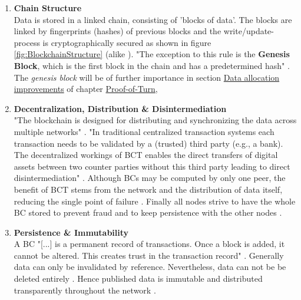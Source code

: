 \begin{enumerate}
	\item \textbf{Chain Structure} \\
	Data is stored in a linked chain, consisting of 'blocks of data'.
	The blocks are linked by fingerprints (hashes) of previous blocks and the write/update-process is cryptographically secured
	as shown in figure \ref{fig:BlockchainStructure} (alike \citet[654]{Lin.2017}).
	"The exception to this rule is the \textbf{Genesis Block}, which is the first block in the chain and has a predetermined hash"
	\cite[181]{Oliveira.2019}.
	The \textit{genesis block} will be of further importance in section \hyperref[sec:DataAllocationImprovements]{Data allocation improvements}
	of chapter \hyperref[chap:PoT]{Proof-of-Turn},
	\begin{figure}
	\end{figure}

	\item \textbf{Decentralization, Distribution \& Disintermediation} \\
	"The blockchain is designed for distributing and synchronizing the data across multiple networks"
	\cite[6]{Sharma.2020}.
	"In traditional centralized transaction systems each transaction needs to be validated by a (trusted) third party (e.g., a bank). The decentralized workings of \gls{BCT} enables the direct transfers of digital assets between two counter parties without this third party leading to direct disintermediation" \cite[17]{Butijn.2020}.
	Although \gls{BC}s may be computed by only one peer, the benefit of \gls{BCT} stems from the network and the distribution of data itself,
	reducing the single point of failure \cite[79764]{Bodkhe.2020}.
	Finally all nodes strive to have the whole \gls{BC} stored to prevent fraud and to keep persistence with the other nodes \cite[79766]{Bodkhe.2020}.
	
	\item \textbf{Persistence \& Immutability} \\
	A \gls{BC} "[...] is a permanent record of transactions. Once a block is added, it cannot be altered. This creates trust in the transaction record" \cite[53]{SultanK..2018}.
	Generally data can only be invalidated by reference.
	Nevertheless, data can not be be deleted entirely \cite[88]{Sharma.2020}.
	Hence published data is immutable and distributed transparently throughout the network \cite[60-61]{Butijn.2020}.
	

\end{enumerate}
